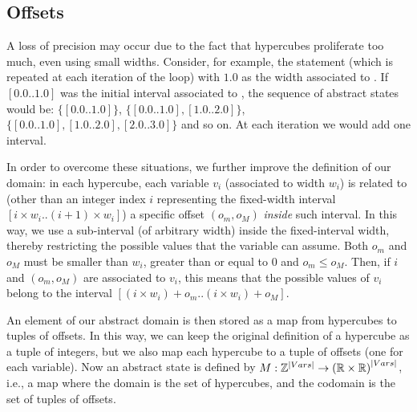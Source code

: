 \vspace{-10pt}
\subsection{Offsets}
\vspace{-5pt}
A loss of precision may occur due to the fact that hypercubes proliferate too much, even using small widths. Consider, for example, the statement  (which is repeated at each iteration of the  loop) with $1.0$ as the width associated to . If $[0.0 .. 1.0]$ was the initial interval associated to , the sequence of abstract states would be: $\{ [0.0 .. 1.0] \}$, $\{ [0.0 .. 1.0], [1.0 .. 2.0] \}$, $\{ [0.0 .. 1.0], [1.0 .. 2.0], [2.0 .. 3.0] \}$ and so on. At each iteration we would add one interval. 

In order to overcome these situations, we further improve the definition of our domain: in each hypercube, each variable $v_i$ (associated to width $w_i$) is related to (other than an integer index $i$ representing the fixed-width interval $[i \times w_i .. (i+1) \times w_i]$) a specific offset $(o_m,o_M)$ \emph{inside} such interval. In this way, we use a sub-interval (of arbitrary width) inside the fixed-interval width, thereby restricting the possible values that the variable can assume. Both $o_m$ and $o_M$ must be smaller than $w_i$, greater than or equal to $0$ and $o_m \leq o_M$. Then, if $i$ and $(o_m,o_M)$ are associated to $v_i$, this means that the possible values of $v_i$ belong to the interval $[(i \times w_i) + o_m .. (i \times w_i) + o_M]$.

An element of our abstract domain is then stored as a map from hypercubes to tuples of offsets. In this way, we can keep the original definition of a hypercube as a tuple of integers, but we also map each hypercube to a tuple of offsets (one for each variable). Now an abstract state is defined by $M : \mathbb{Z}^{|Vars|} \rightarrow{(\ensuremath{\mathbb{R}}\times \ensuremath{\mathbb{R}})}^{|Vars|}$, i.e., a map where the domain is the set of hypercubes, and the codomain is the set of tuples of offsets.

